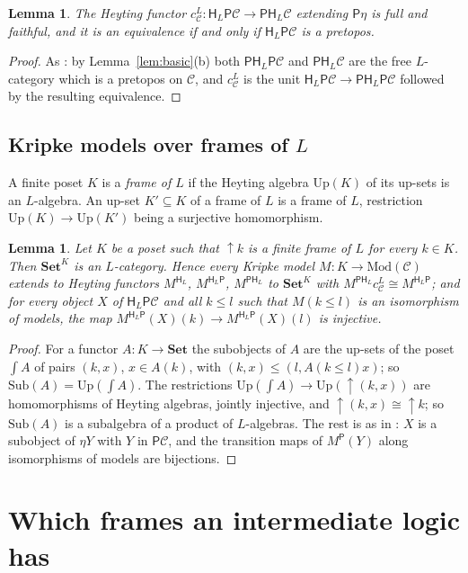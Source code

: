 \documentclass[11pt]{amsart}
\newtheorem{lem}[thm]{Lemma}
\theoremstyle{definition}
\newcommand{\Mod}{\mathrm{Mod}}
\newcommand{\Set}{\mathbf{Set}}
\newcommand{\Sub}{\mathrm{Sub}}
\newcommand{\Up}{\mathrm{Up}}
\newcommand{\PP}{\mathsf P}
\newcommand{\HH}{\mathsf H}
\newcommand{\cC}{\mathcal C}
\begin{document}
\begin{lem}\label{lem:ff}
The Heyting functor $c^L_\cC\colon\HH_L\PP\cC\to\PP\HH_L\cC$ extending
$\PP\eta$ is full and faithful, and it is an equivalence if and only if
$\HH_L\PP\cC$ is a pretopos.
\end{lem}
\begin{proof}
As \cite[Lemma~2.3]{Heyting}: by Lemma~\ref{lem:basic}(b) both
$\PP\HH_L\PP\cC$ and $\PP\HH_L\cC$ are the free $L$-category which is a
pretopos on $\cC$, and $c^L_\cC$ is the unit $\HH_L\PP\cC\to\PP\HH_L
\PP\cC$ followed by the resulting equivalence.
\end{proof}

\subsection*{Kripke models over frames of $L$}
A finite poset $K$ is a \emph{frame of $L$} if the Heyting algebra
$\Up(K)$ of its up-sets is an $L$-algebra. An up-set $K'\subseteq K$ of
a frame of $L$ is a frame of $L$, restriction $\Up(K)\to\Up(K')$ being
a surjective homomorphism.

\begin{lem}\label{lem:kripke}
Let $K$ be a poset such that $\uparrow\!k$ is a finite frame of $L$
for every $k\in K$. Then $\Set^K$ is an $L$-category. Hence every
Kripke model $M\colon K\to\Mod(\cC)$ extends to Heyting functors
$M^{\HH_L}$, $M^{\HH_L\PP}$, $M^{\PP\HH_L}$ to $\Set^K$ with
$M^{\PP\HH_L}c^L_\cC\cong M^{\HH_L\PP}$; and for every object $X$ of
$\HH_L\PP\cC$ and all $k\le l$ such that $M(k\le l)$ is an isomorphism
of models, the map $M^{\HH_L\PP}(X)(k)\to M^{\HH_L\PP}(X)(l)$ is
injective.
\end{lem}
\begin{proof}
For a functor $A\colon K\to\Set$ the subobjects of $A$ are the up-sets
of the poset $\int\!A$ of pairs $(k,x)$, $x\in A(k)$, with
$(k,x)\le(l,A(k\le l)x)$; so $\Sub(A)=\Up(\int\!A)$. The restrictions
$\Up(\int\!A)\to\Up(\uparrow\!(k,x))$ are homomorphisms of Heyting
algebras, jointly injective, and $\uparrow\!(k,x)\cong\uparrow\!k$; so
$\Sub(A)$ is a subalgebra of a product of $L$-algebras. The rest is as
in \cite[\S3, Lemma~3.1]{Heyting}: $X$ is a subobject of $\eta Y$ with
$Y$ in $\PP\cC$, and the transition maps of $M^{\PP}(Y)$ along
isomorphisms of models are bijections.
\end{proof}

\section{Which frames an intermediate logic has}
\end{document}
